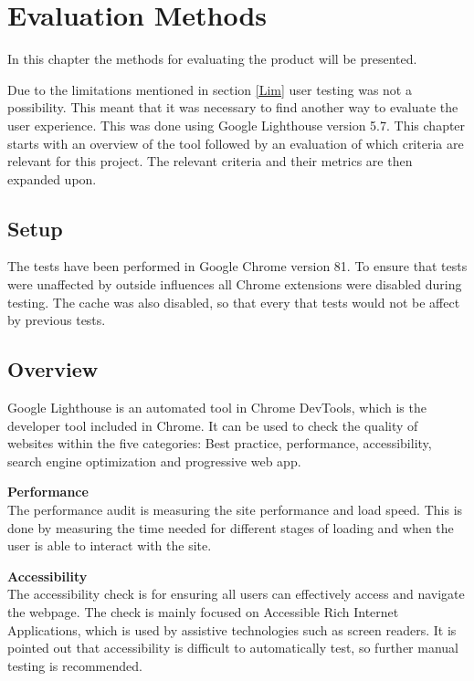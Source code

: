 \chapter{Evaluation Methods}

In this chapter the methods for evaluating the product will be presented.


Due to the limitations mentioned in section \ref{Lim} user testing was not a possibility. This meant that it was necessary to find another way to evaluate the user experience. This was done using Google Lighthouse version 5.7. 
This chapter starts with an overview of the tool followed by an evaluation of which criteria are relevant for this project. The relevant criteria and their metrics are then expanded upon.

\section{Setup}


The tests have been performed in Google Chrome version 81. To ensure that tests were unaffected by outside influences all Chrome extensions were disabled during testing. The cache was also disabled, so that every that tests would not be affect by previous tests.


\section{Overview}
Google Lighthouse is an automated tool in Chrome DevTools, which is the developer tool included in Chrome. It can be used to check the quality of websites within the five categories: Best practice, performance, accessibility, search engine optimization and progressive web app. \citep{Lighthouse}

\textbf{Performance}\\
The performance audit is measuring the site performance and load speed. This is done by measuring the time needed for different stages of loading and when the user is able to interact with the site. \citep{LhPerformance}


\textbf{Accessibility}\\
The accessibility check is for ensuring all users can effectively access and navigate the webpage. 
The check is mainly focused on Accessible Rich Internet Applications, which is used by assistive technologies such as screen readers.\citep{ARIA} It is pointed out that accessibility is difficult to automatically test, so further manual testing is recommended. 

